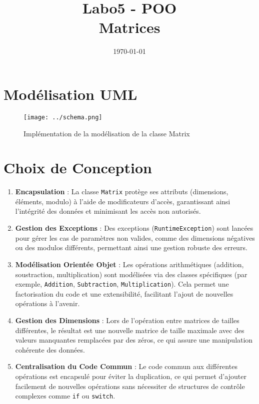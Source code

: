 \documentclass[12pt, a4paper, onecolumn]{article}
\title{Labo5 - POO \\ Matrices}
\author{
	\authorstyle{Dani Tiago \largename{Faria dos Santos}\\ Antoine \largename{Aubry } \\ \\ Groupe  \textbf{L02GrD}\\ HEIG-VD} %
}
\date{\today}
\begin{document}
	\twocolumn[ 
	\maketitle
	]
	
	\onecolumn 
	
	\tableofcontents
	\newpage
	
	\section{Modélisation UML}
	\begin{figure}[H]
	\centering
	\texttt{[image: ../schema.png]}
	\caption{Implémentation de la modélisation de la classe Matrix}
\end{figure}
	
	\section{Choix de Conception}
	\begin{flushleft}
\begin{enumerate}
	\item \textbf{Encapsulation} : 
	La classe \texttt{Matrix} protège ses attributs (dimensions, éléments, modulo) à l'aide de modificateurs d'accès, garantissant ainsi l'intégrité des données et minimisant les accès non autorisés.
	
	\item \textbf{Gestion des Exceptions} : 
	Des exceptions (\texttt{RuntimeException}) sont lancées pour gérer les cas de paramètres non valides, comme des dimensions négatives ou des modulos différents, permettant ainsi une gestion robuste des erreurs.
	
	\item \textbf{Modélisation Orientée Objet} : 
	Les opérations arithmétiques (addition, soustraction, multiplication) sont modélisées via des classes spécifiques (par exemple, \texttt{Addition}, \texttt{Subtraction}, \texttt{Multiplication}). Cela permet une factorisation du code et une extensibilité, facilitant l'ajout de nouvelles opérations à l'avenir.
	
	\item \textbf{Gestion des Dimensions} : 
	Lors de l'opération entre matrices de tailles différentes, le résultat est une nouvelle matrice de taille maximale avec des valeurs manquantes remplacées par des zéros, ce qui assure une manipulation cohérente des données.

    \item \textbf{Centralisation du Code Commun} : 
	Le code commun aux différentes opérations est encapsulé pour éviter la duplication, ce qui permet d'ajouter facilement de nouvelles opérations sans nécessiter de structures de contrôle complexes comme \texttt{if} ou \texttt{switch}.

\end{enumerate}
\end{flushleft}
	
\end{document}
